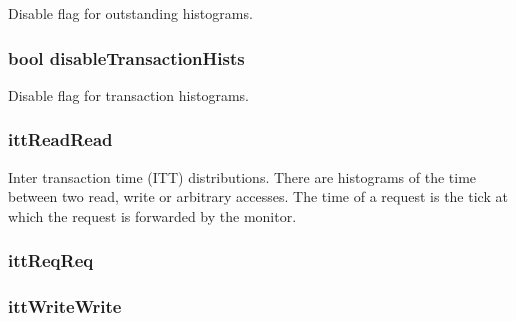 \label{structCommMonitor_1_1MonitorStats_a58fa22f2c5716fcf2e67cfdfb9ccfb24}
Disable flag for outstanding histograms. \hypertarget{structCommMonitor_1_1MonitorStats_ab8f91b70ae09ec94249a1bb50adeba3f}{
\subsubsection[{disableTransactionHists}]{\setlength{\rightskip}{0pt plus 5cm}bool {\bf disableTransactionHists}}}
\label{structCommMonitor_1_1MonitorStats_ab8f91b70ae09ec94249a1bb50adeba3f}
Disable flag for transaction histograms. \hypertarget{structCommMonitor_1_1MonitorStats_a2898ccf55e5b25e410b8f90553212a71}{
\subsubsection[{ittReadRead}]{ {\bf ittReadRead}}}
\label{structCommMonitor_1_1MonitorStats_a2898ccf55e5b25e410b8f90553212a71}
Inter transaction time (ITT) distributions. There are histograms of the time between two read, write or arbitrary accesses. The time of a request is the tick at which the request is forwarded by the monitor. \hypertarget{structCommMonitor_1_1MonitorStats_a2534f8cd715e5bc6e07e14f9727428eb}{
\subsubsection[{ittReqReq}]{ {\bf ittReqReq}}}
\label{structCommMonitor_1_1MonitorStats_a2534f8cd715e5bc6e07e14f9727428eb}
\hypertarget{structCommMonitor_1_1MonitorStats_a6195d4cdad35fc6c4a2c2339ae3f633a}{
\subsubsection[{ittWriteWrite}]{ {\bf ittWriteWrite}}}
